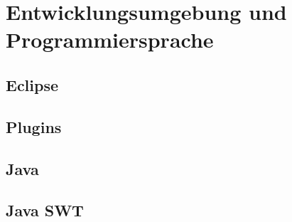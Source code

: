 \paragraph{}



\section{Entwicklungsumgebung und Programmiersprache}
\paragraph{}

\subsection{Eclipse}
\paragraph{}


\subsection{Plugins}
\paragraph{}


\subsection{Java}
\paragraph{}


\subsection{Java SWT}
\paragraph{}